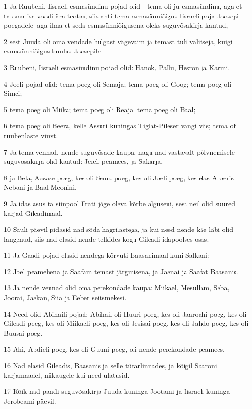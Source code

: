 \par 1 Ja Ruubeni, Iisraeli esmasündinu pojad olid - tema oli ju esmasündinu, aga et ta oma isa voodi ära teotas, siis anti tema esmasünniõigus Iisraeli poja Joosepi poegadele, aga ilma et seda esmasünniõigusena oleks suguvõsakirja kantud,
\par 2 sest Juuda oli oma vendade hulgast vägevaim ja temast tuli valitseja, kuigi esmasünniõigus kuulus Joosepile -
\par 3 Ruubeni, Iisraeli esmasündinu pojad olid: Hanok, Pallu, Hesron ja Karmi.
\par 4 Joeli pojad olid: tema poeg oli Semaja; tema poeg oli Goog; tema poeg oli Simei;
\par 5 tema poeg oli Miika; tema poeg oli Reaja; tema poeg oli Baal;
\par 6 tema poeg oli Beera, kelle Assuri kuningas Tiglat-Pileser vangi viis; tema oli ruubenlaste vürst.
\par 7 Ja tema vennad, nende suguvõsade kaupa, nagu nad vastavalt põlvnemisele suguvõsakirja olid kantud: Jeiel, peamees, ja Sakarja,
\par 8 ja Bela, Aasase poeg, kes oli Sema poeg, kes oli Joeli poeg, kes elas Aroeris Neboni ja Baal-Meonini.
\par 9 Ja idas asus ta siinpool Frati jõge oleva kõrbe alguseni, sest neil olid suured karjad Gileadimaal.
\par 10 Sauli päevil pidasid nad sõda hagrilastega, ja kui need nende käe läbi olid langenud, siis nad elasid nende telkides kogu Gileadi idapoolses osas.
\par 11 Ja Gaadi pojad elasid nendega kõrvuti Baasanimaal kuni Salkani:
\par 12 Joel peamehena ja Saafam temast järgmisena, ja Jaenai ja Saafat Baasanis.
\par 13 Ja nende vennad olid oma perekondade kaupa: Miikael, Mesullam, Seba, Joorai, Jaekan, Siia ja Eeber seitsmekesi.
\par 14 Need olid Abihaili pojad; Abihail oli Huuri poeg, kes oli Jaaroahi poeg, kes oli Gileadi poeg, kes oli Miikaeli poeg, kes oli Jesisai poeg, kes oli Jahdo poeg, kes oli Buusai poeg.
\par 15 Ahi, Abdieli poeg, kes oli Guuni poeg, oli nende perekondade peamees.
\par 16 Nad elasid Gileadis, Baasanis ja selle tütarlinnades, ja kõigil Saaroni karjamaadel, niikaugele kui need ulatusid.
\par 17 Kõik nad pandi suguvõsakirja Juuda kuninga Jootami ja Iisraeli kuninga Jerobeami päevil.
